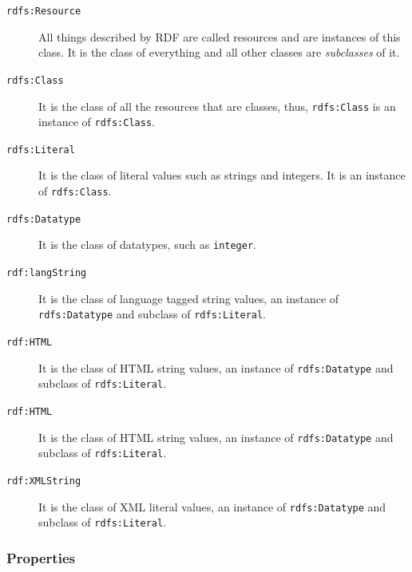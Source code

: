 \begin{description}
\item[\texttt{rdfs:Resource}] All things described by RDF are called resources and are instances of this class. It is the class of everything and all other classes are \textit{subclasses} of it.

\item[\texttt{rdfs:Class}] It is the class of all the resources that are classes, thus, \texttt{rdfs:Class} is an instance of \texttt{rdfs:Class}.

\item[\texttt{rdfs:Literal}] It is the class of literal values such as strings and integers. It is an instance of \texttt{rdfs:Class}.

\item[\texttt{rdfs:Datatype}] It is the class of datatypes, such as \texttt{integer}.

\item[\texttt{rdf:langString}] It is the class of language tagged string values, an instance of \texttt{rdfs:Datatype} and subclass of \texttt{rdfs:Literal}.

\item[\texttt{rdf:HTML}] It is the class of HTML string values, an instance of \texttt{rdfs:Datatype} and subclass of \texttt{rdfs:Literal}.

\item[\texttt{rdf:HTML}] It is the class of HTML string values, an instance of \texttt{rdfs:Datatype} and subclass of \texttt{rdfs:Literal}.

\item[\texttt{rdf:XMLString}] It is the class of XML literal values, an instance of \texttt{rdfs:Datatype} and subclass of \texttt{rdfs:Literal}.

\end{description}

\subsubsection*{Properties}

